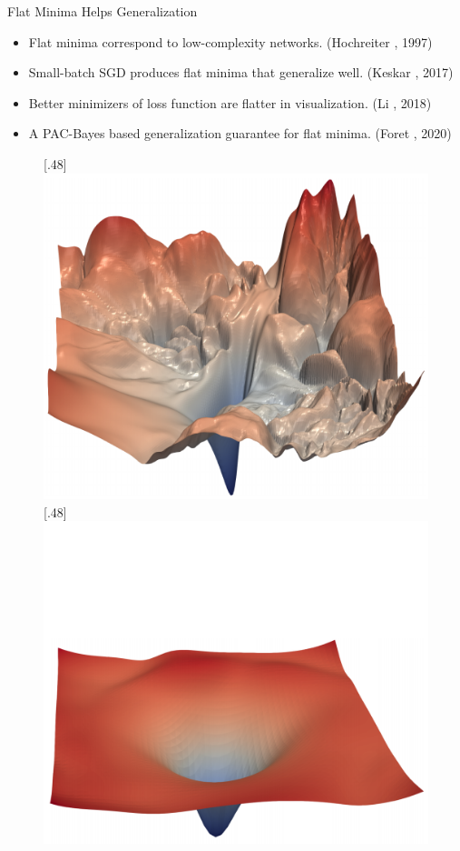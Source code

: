 \begin{frame}{Flat Minima Helps Generalization}

\begin{itemize}
    \item Flat minima correspond to low-complexity networks. (Hochreiter \etal, 1997)
    \item Small-batch SGD produces flat minima that generalize well. (Keskar \etal, 2017)
    \item Better minimizers of loss function are flatter in visualization. (Li \etal, 2018)
    \item A PAC-Bayes based generalization guarantee for flat minima. (Foret \etal, 2020)
\end{itemize}

\begin{figure}
[.48\textwidth]{\includegraphics[width=.25\textwidth]{figs/flatness_a.png}}
[.48\textwidth]{\includegraphics[width=.25\textwidth]{figs/flatness_b.png}}
\end{figure}
\end{frame}

